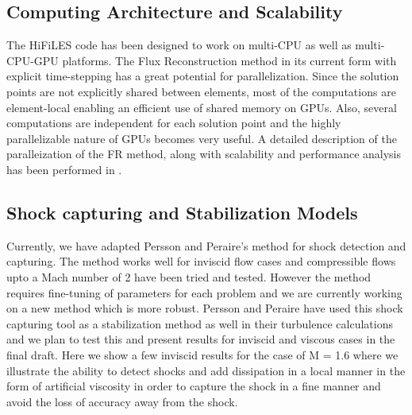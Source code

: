 \subsection{Computing Architecture and Scalability}

The HiFiLES code has been designed to work on multi-CPU as well as multi-CPU-GPU platforms. The Flux Reconstruction method in its current form with explicit time-stepping has a great potential for parallelization. Since the solution points are not explicitly shared between elements, most of the computations are element-local enabling an efficient use of shared memory on GPUs. Also, several computations are independent for each solution point and the highly parallelizable nature of GPUs becomes very useful. A detailed description of the paralleization of the FR method, along with scalability and performance analysis has been performed in \cite{castonguay2011}.

\subsection{Shock capturing and Stabilization Models}


Currently, we have adapted Persson and Peraire's method \cite{Persson06} for shock detection and capturing. The method works well for inviscid flow cases and compressible flows upto a Mach number of 2 have been tried and tested. However the method requires fine-tuning of parameters for each problem and we are currently working on a new method which is more robust. Persson and Peraire have used this shock capturing tool as a stabilization method as well in their turbulence calculations and we plan to test this and present results for inviscid and viscous cases in the final draft. Here we show a few inviscid results for the case of M = 1.6 where we illustrate the ability to detect shocks and add dissipation in a local manner in the form of artificial viscosity in order to capture the shock in a fine manner and avoid the loss of accuracy away from the shock.    

